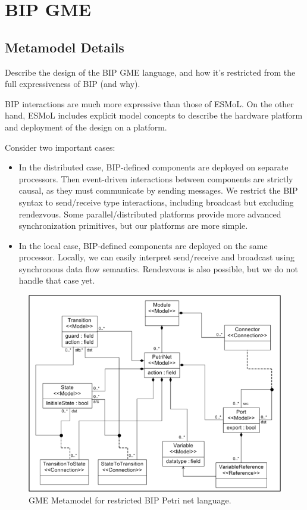 \section{BIP GME}

\subsection{Metamodel Details}

Describe the design of the BIP GME language, and how it's restricted from the full expressiveness of BIP (and why).

BIP interactions are much more expressive than those of ESMoL.  On the other hand, ESMoL includes explicit model concepts to describe the hardware platform and deployment of the design on a platform.

Consider two important cases:

\begin{itemize}
\item In the distributed case, BIP-defined components are deployed on separate processors.  Then event-driven interactions between components are strictly causal, as they must communicate by sending messages.  We restrict the BIP syntax to send/receive type interactions, including broadcast but excluding rendezvous. Some parallel/distributed platforms provide more advanced synchronization primitives, but our platforms are more simple.
\item In the local case, BIP-defined components are deployed on the same processor.  Locally, we can easily interpret send/receive and broadcast using synchronous data flow semantics.  Rendezvous is also possible, but we do not handle that case yet.
\end{itemize}

\begin{figure}[htb]
	\centering
		\includegraphics[width=1.00\textwidth]{figures/bip_gme_meta.png}
	\caption{GME Metamodel for restricted BIP Petri net language.}
	\label{fig:bip_gme_meta}
\end{figure}

